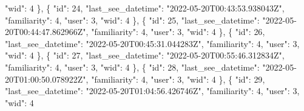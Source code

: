 \documentclass[
]{article}
\newenvironment{Shaded}{}{}
\newcommand{\DataTypeTok}[1]{\textcolor[rgb]{0.56,0.13,0.00}{#1}}
\newcommand{\DecValTok}[1]{\textcolor[rgb]{0.25,0.63,0.44}{#1}}
\newcommand{\FunctionTok}[1]{\textcolor[rgb]{0.02,0.16,0.49}{#1}}
\newcommand{\OtherTok}[1]{\textcolor[rgb]{0.00,0.44,0.13}{#1}}
\newcommand{\StringTok}[1]{\textcolor[rgb]{0.25,0.44,0.63}{#1}}
\begin{document}
\begin{Shaded}
\begin{Highlighting}[]
    \DataTypeTok{"wid"}\FunctionTok{:} \DecValTok{4}
  \FunctionTok{\}}\OtherTok{,}
  \FunctionTok{\{}
    \DataTypeTok{"id"}\FunctionTok{:} \DecValTok{24}\FunctionTok{,}
    \DataTypeTok{"last\_see\_datetime"}\FunctionTok{:} \StringTok{"2022{-}05{-}20T00:43:53.938043Z"}\FunctionTok{,}
    \DataTypeTok{"familiarity"}\FunctionTok{:} \DecValTok{4}\FunctionTok{,}
    \DataTypeTok{"user"}\FunctionTok{:} \DecValTok{3}\FunctionTok{,}
    \DataTypeTok{"wid"}\FunctionTok{:} \DecValTok{4}
  \FunctionTok{\}}\OtherTok{,}
  \FunctionTok{\{}
    \DataTypeTok{"id"}\FunctionTok{:} \DecValTok{25}\FunctionTok{,}
    \DataTypeTok{"last\_see\_datetime"}\FunctionTok{:} \StringTok{"2022{-}05{-}20T00:44:47.862966Z"}\FunctionTok{,}
    \DataTypeTok{"familiarity"}\FunctionTok{:} \DecValTok{4}\FunctionTok{,}
    \DataTypeTok{"user"}\FunctionTok{:} \DecValTok{3}\FunctionTok{,}
    \DataTypeTok{"wid"}\FunctionTok{:} \DecValTok{4}
  \FunctionTok{\}}\OtherTok{,}
  \FunctionTok{\{}
    \DataTypeTok{"id"}\FunctionTok{:} \DecValTok{26}\FunctionTok{,}
    \DataTypeTok{"last\_see\_datetime"}\FunctionTok{:} \StringTok{"2022{-}05{-}20T00:45:31.044283Z"}\FunctionTok{,}
    \DataTypeTok{"familiarity"}\FunctionTok{:} \DecValTok{4}\FunctionTok{,}
    \DataTypeTok{"user"}\FunctionTok{:} \DecValTok{3}\FunctionTok{,}
    \DataTypeTok{"wid"}\FunctionTok{:} \DecValTok{4}
  \FunctionTok{\}}\OtherTok{,}
  \FunctionTok{\{}
    \DataTypeTok{"id"}\FunctionTok{:} \DecValTok{27}\FunctionTok{,}
    \DataTypeTok{"last\_see\_datetime"}\FunctionTok{:} \StringTok{"2022{-}05{-}20T00:55:46.312834Z"}\FunctionTok{,}
    \DataTypeTok{"familiarity"}\FunctionTok{:} \DecValTok{4}\FunctionTok{,}
    \DataTypeTok{"user"}\FunctionTok{:} \DecValTok{3}\FunctionTok{,}
    \DataTypeTok{"wid"}\FunctionTok{:} \DecValTok{4}
  \FunctionTok{\}}\OtherTok{,}
  \FunctionTok{\{}
    \DataTypeTok{"id"}\FunctionTok{:} \DecValTok{28}\FunctionTok{,}
    \DataTypeTok{"last\_see\_datetime"}\FunctionTok{:} \StringTok{"2022{-}05{-}20T01:00:50.078922Z"}\FunctionTok{,}
    \DataTypeTok{"familiarity"}\FunctionTok{:} \DecValTok{4}\FunctionTok{,}
    \DataTypeTok{"user"}\FunctionTok{:} \DecValTok{3}\FunctionTok{,}
    \DataTypeTok{"wid"}\FunctionTok{:} \DecValTok{4}
  \FunctionTok{\}}\OtherTok{,}
  \FunctionTok{\{}
    \DataTypeTok{"id"}\FunctionTok{:} \DecValTok{29}\FunctionTok{,}
    \DataTypeTok{"last\_see\_datetime"}\FunctionTok{:} \StringTok{"2022{-}05{-}20T01:04:56.426746Z"}\FunctionTok{,}
    \DataTypeTok{"familiarity"}\FunctionTok{:} \DecValTok{4}\FunctionTok{,}
    \DataTypeTok{"user"}\FunctionTok{:} \DecValTok{3}\FunctionTok{,}
    \DataTypeTok{"wid"}\FunctionTok{:} \DecValTok{4}

\end{Highlighting}
\end{Shaded}
\end{document}
